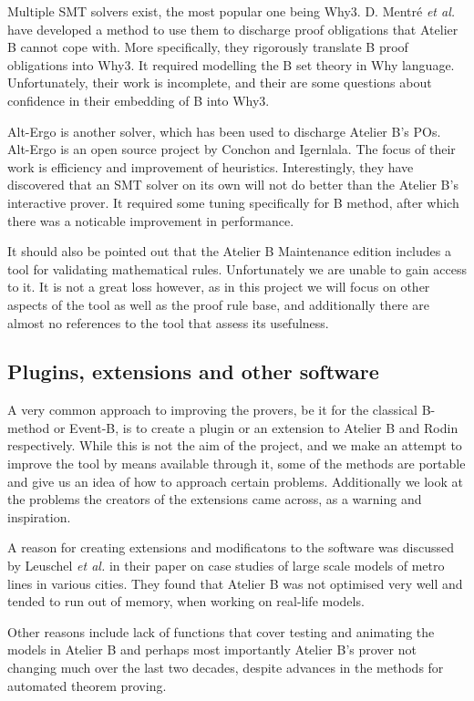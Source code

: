 \documentclass[11pt,journal]{IEEEtran}
\begin{document}
	Multiple SMT solvers exist, the most popular one being Why3. D. Mentr\'{e} \emph{et al.} have developed a method to use them to discharge proof obligations that Atelier B cannot cope with. More specifically, they rigorously translate B proof obligations into Why3. It required modelling the B set theory in Why language. Unfortunately, their work is incomplete, and their are some questions about confidence in their embedding of B into Why3.
	
	Alt-Ergo is another solver, which has been used to discharge Atelier B's POs.\cite{Alt-Ergo} Alt-Ergo is an open source project by Conchon and Igernlala. The focus of their work is efficiency and improvement of heuristics. Interestingly, they have discovered that an SMT solver on its own will not do better than the Atelier B's interactive prover. It required some tuning specifically for B method, after which there was a noticable improvement in performance.
	
	It should also be pointed out that the Atelier B Maintenance edition includes a tool for validating mathematical rules. Unfortunately we are unable to gain access to it. It is not a great loss however, as in this project we will focus on other aspects of the tool as well as the proof rule base, and additionally there are almost no references to the tool that assess its usefulness.
	
	\subsection{Plugins, extensions and other software}
	
	A very common approach to improving the provers, be it for the classical B-method or Event-B, is to create a plugin or an extension to Atelier B and Rodin respectively. While this is not the aim of the project, and we make an attempt to improve the tool by means available through it, some of the methods are portable and give us an idea of how to approach certain problems. Additionally we look at the problems the creators of the extensions came across, as a warning and inspiration.
	
	A reason for creating extensions and modificatons to the software was discussed by Leuschel \emph{et al.} in their paper on case studies of large scale models of metro lines in various cities\cite{San Juan metro}. They found that Atelier B was not optimised very well and tended to run out of memory, when working on real-life models.
	
	Other reasons include lack of functions that cover testing and animating the models in Atelier B and perhaps most importantly Atelier B's prover not changing much over the last two decades, despite advances in the methods for automated theorem proving.
	
\end{document}
